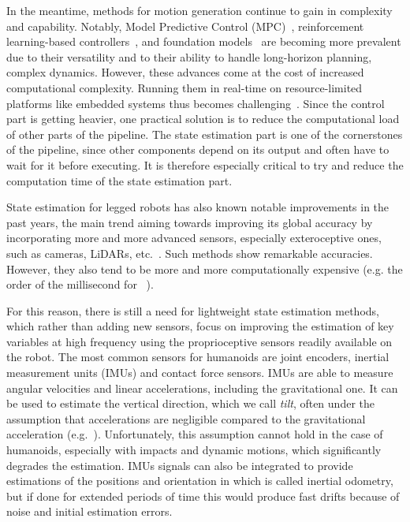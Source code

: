 \documentclass{IJCAS}
\begin{document}
In the meantime, methods for motion generation continue to gain in complexity and capability. Notably, Model Predictive Control (MPC)~\cite{Katayama2023MpcLeggedHumanoid, Dallard2024AdiosStabilizers}, reinforcement learning-based controllers~\cite{Peters2003ReinforcmentLearningForHumanoid, Li2025RLVersatileDynamicRobustBipedalLocom}, and foundation models~\cite{ kawaharazuka2024RealWorldApplicationsFoundationModels, Firoozi2025FoundationModelsInRobotics} are becoming more prevalent due to their versatility and to their ability to handle long-horizon planning, complex dynamics. However, these advances come at the cost of increased computational complexity. Running them in real-time on resource-limited platforms like embedded systems thus becomes challenging~\cite{Zeilinger2014RealTimeRobustMPC, findeisen2004computationalDelayNMPC, Thodoroff2022BenchmarkingRealTimeRL, Firoozi2025FoundationModelsInRobotics}. Since the control part is getting heavier, one practical solution is to reduce the computational load of other parts of the pipeline. The state estimation part is one of the cornerstones of the pipeline, since other components depend on its output and often have to wait for it before executing. It is therefore especially critical to try and reduce the computation time of the state estimation part.

State estimation for legged robots has also known notable improvements in the past years, the main trend aiming towards improving its global accuracy by incorporating more and more advanced sensors, especially exteroceptive ones, such as cameras, LiDARs, etc.~\cite{wisth2022vilens, Kuang2024TightlyCoupledLidarImuUwb}. Such methods show remarkable accuracies. However, they also tend to be more and more computationally expensive (e.g. the order of the millisecond for ~\cite{Kuang2024TightlyCoupledLidarImuUwb}).

For this reason, there is still a need for lightweight state estimation methods, which rather than adding new sensors, focus on improving the estimation of key variables at high frequency using the proprioceptive sensors readily available on the robot. The most common sensors for humanoids are joint encoders, inertial measurement units (IMUs) and contact force sensors. IMUs are able to measure angular velocities and linear accelerations, including the gravitational one. It can be used to estimate the vertical direction, which we call \emph{tilt}, often under the assumption that accelerations are negligible compared to the gravitational acceleration (e.g.~\cite{mahony2008NonlinearComplementaryFiltersOnSO3}). Unfortunately, this assumption cannot hold in the case of humanoids, especially with impacts and dynamic motions, which significantly degrades the estimation. IMUs signals can also be integrated to provide estimations of the positions and orientation in which is called inertial odometry, but if done for extended periods of time this would produce fast drifts because of noise and initial estimation errors.
\end{document}
